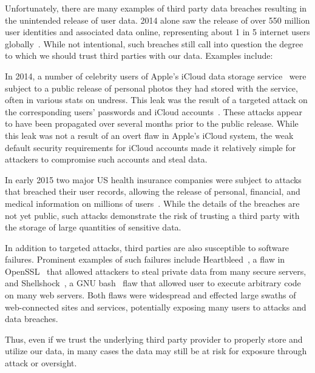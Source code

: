 Unfortunately, there are many examples of third party data breaches
resulting in the unintended release of user data. 2014 alone saw the
release of over 550 million user identities and associated data
online, representing about 1 in 5 internet users
globally~\cite{symanteccorporation2014}. While not intentional, such
breaches still call into question the degree to which we should trust
third parties with our data. Examples include:

\begin{packed_desc}
\item[Apple iCloud Celebrity Photo Leak:] In 2014, a number of
  celebrity users of Apple's iCloud data storage
  service~\cite{apple-icloud} were subject to a public release of
  personal photos they had stored with the service, often in various
  stats on undress. This leak was the result of a targeted attack on
  the corresponding users' passwords and iCloud
  accounts~\cite{apple-icloudleak}. These attacks appear to have been
  propagated over several months prior to the public release. While
  this leak was not a result of an overt flaw in Apple's iCloud
  system, the weak default security requirements for iCloud accounts
  made it relatively simple for attackers to compromise such accounts
  and steal data.
\item[Anthem and Premera Blue Cross Breaches:] In early 2015 two major
  US health insurance companies were subject to attacks that breached
  their user records, allowing the release of personal, financial, and
  medical information on millions of users~\cite{krebs-anthem,
    krebs-premera}. While the details of the breaches are not yet
  public, such attacks demonstrate the risk of trusting a third party
  with the storage of large quantities of sensitive data.
\item[Heartbleed, Shellshock, Etc:] In addition to targeted attacks,
  third parties are also susceptible to software failures. Prominent
  examples of such failures include Heartbleed~\cite{heartbleed}, a
  flaw in OpenSSL~\cite{openssl} that allowed attackers to steal
  private data from many secure servers, and
  Shellshock~\cite{symantec-shellshock}, a GNU bash~\cite{gnu-bash}
  flaw that allowed user to execute arbitrary code on many web
  servers. Both flaws were widespread and effected large swaths of
  web-connected sites and services, potentially exposing many users to
  attacks and data breaches.
\end{packed_desc}

Thus, even if we trust the underlying third party provider to properly
store and utilize our data, in many cases the data may still be at
risk for exposure through attack or oversight.

